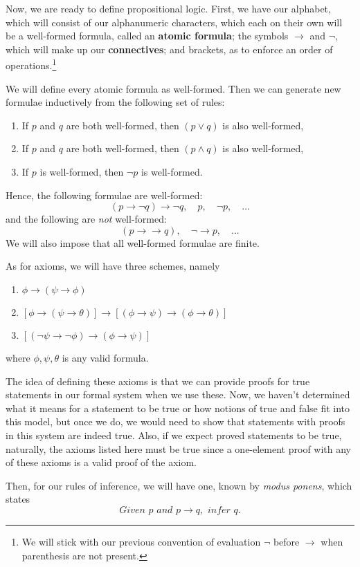 Now, we are ready to define propositional logic.
First, we have our alphabet, which will consist of our alphanumeric characters, which each on their own will be a well-formed formula, called an \textbf{atomic formula};
the symbols $\to$ and $\neg$, which will make up our \textbf{connectives};
and brackets, as to enforce an order of operations.\footnote{
We will stick with our previous convention of evaluation $\neg$ before $\to$ when parenthesis are not present.}

We will define every atomic formula as well-formed.
Then we can generate new formulae inductively from the following set of rules:
\begin{enumerate}
	\item If $p$ and $q$ are both well-formed, then $(p\vee q)$ is also well-formed,
	\item If $p$ and $q$ are both well-formed, then $(p\wedge q)$ is also well-formed,
	\item If $p$ is well-formed, then $\neg p$ is well-formed.
\end{enumerate}
Hence, the following formulae are well-formed:
$$(p \to \neg q) \to \neg q, \quad p, \quad \neg p, \quad ...$$
and the following are \textit{not} well-formed:
$$(p \to \to q), \quad \neg \to p, \quad ...$$
We will also impose that all well-formed formulae are finite.

As for axioms, we will have three schemes, namely
\begin{enumerate}[label=(A\arabic*), leftmargin=4em]
	\item $\phi \to (\psi \to \phi)$
	\item $[\phi \to (\psi \to \theta)] \to [(\phi \to  \psi) \to (\phi \to \theta)]$
	\item $[(\neg \psi \to \neg \phi) \to (\phi \to \psi)]$
\end{enumerate}
where $\phi, \psi, \theta$ is any valid formula.

The idea of defining these axioms is that we can provide proofs for true statements in our formal system when we use these.
Now, we haven't determined what it means for a statement to be true or how notions of true and false fit into this model, but once we do, we would need to show that statements with proofs in this system are indeed true.
Also, if we expect proved statements to be true, naturally, the axioms listed here must be true since a one-element proof with any of these axioms is a valid proof of the axiom.

Then, for our rules of inference, we will have one, known by \textit{modus ponens}, which states
$$\textit{Given } p \textit{ and } p \to q, \textit{ infer } q.$$

